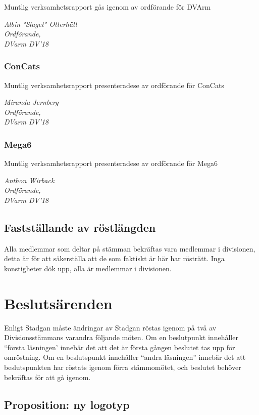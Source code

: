 \documentclass[protokoll]{dvd}
\begin{document}
Muntlig verksamhetsrapport gås igenom av ordförande för DVArm

\emph{Albin "Slaget" Otterhäll \\ Ordförande, \\ DVarm DV'18}

\subsubsection*{ConCats}
Muntlig verksamhetsrapport presenteradese av ordförande för ConCats

\emph{Miranda Jernberg \\ Ordförande, \\ DVarm DV'18}

\subsubsection*{Mega6}
Muntlig verksamhetsrapport presenteradese av ordförande för Mega6

\emph{Anthon Wirback \\ Ordförande, \\ DVarm DV'18}

\subsection{Fastställande av röstlängden}

Alla medlemmar som deltar på stämman bekräftas vara medlemmar i divisionen, detta är för att säkerställa att de som faktiskt är här har rösträtt.
Inga konstigheter dök upp, alla är medlemmar i divisionen.


\newpage

\section{Beslutsärenden}

Enligt Stadgan måste ändringar av Stadgan röstas igenom på två av Divisionsstämmans varandra följande möten.
Om en beslutpunkt innehåller ``första läsningen' innebär det att det är första gången beslutet tas upp för omröstning.
Om en beslutspunkt innehåller ``andra läsningen'' innebär det att beslutspunkten har röstats igenom förra stämmomötet, och beslutet behöver bekräftas för att gå igenom.


\subsection{Proposition: ny logotyp}
\end{document}
